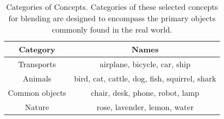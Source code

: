 \begin{table}[ht]
\caption{Categories of Concepts. Categories of these selected concepts for blending are designed to encompass the primary objects commonly found in the real world.}
\vspace{3mm}
\centering
\begin{tabular}{|c|c|}
\hline
\textbf{Category} & \textbf{Names} \\ \hline
Transports & airplane, bicycle, car, 
 ship\\ \hline
Animals & bird, cat, cattle, dog, fish, squirrel, shark  \\ \hline
Common objects & chair, desk, phone, robot, lamp \\ \hline
Nature & rose, lavender, lemon, water \\ \hline
\end{tabular}
\label{categories_table}
\end{table}